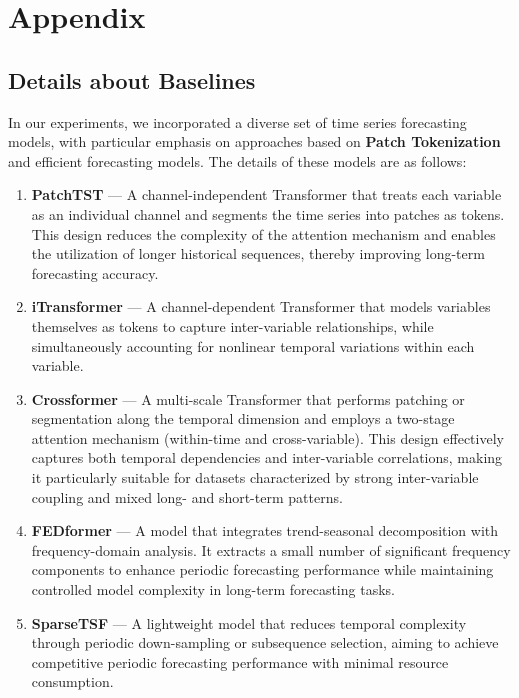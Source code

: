 \section{Appendix}
\label{sec:appendix}

\subsection{Details about Baselines}
In our experiments, we incorporated a diverse set of time series forecasting models, with particular emphasis on approaches based on \textbf{Patch Tokenization} and efficient forecasting models. The details of these models are as follows:

\begin{enumerate}

    \item \textbf{PatchTST} — A channel-independent Transformer that treats each variable as an individual channel and segments the time series into patches as tokens. This design reduces the complexity of the attention mechanism and enables the utilization of longer historical sequences, thereby improving long-term forecasting accuracy.

    \item \textbf{iTransformer} — A channel-dependent Transformer that models variables themselves as tokens to capture inter-variable relationships, while simultaneously accounting for nonlinear temporal variations within each variable.

    \item \textbf{Crossformer} — A multi-scale Transformer that performs patching or segmentation along the temporal dimension and employs a two-stage attention mechanism (within-time and cross-variable). This design effectively captures both temporal dependencies and inter-variable correlations, making it particularly suitable for datasets characterized by strong inter-variable coupling and mixed long- and short-term patterns.

    \item \textbf{FEDformer} — A model that integrates trend-seasonal decomposition with frequency-domain analysis. It extracts a small number of significant frequency components to enhance periodic forecasting performance while maintaining controlled model complexity in long-term forecasting tasks.

    \item \textbf{SparseTSF} — A lightweight model that reduces temporal complexity through periodic down-sampling or subsequence selection, aiming to achieve competitive periodic forecasting performance with minimal resource consumption.


\end{enumerate}
